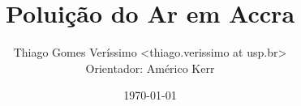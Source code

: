 \documentclass{beamer}
\begin{document}
  \title{Poluição do Ar em Accra}
  \author{Thiago Gomes Veríssimo <thiago.verissimo at usp.br> \\
          Orientador: Américo Kerr}
  \date{\today}

\begin{frame}
  \titlepage
\end{frame}

\begin{frame}
  \tableofcontents
\end{frame}






\end{document}
